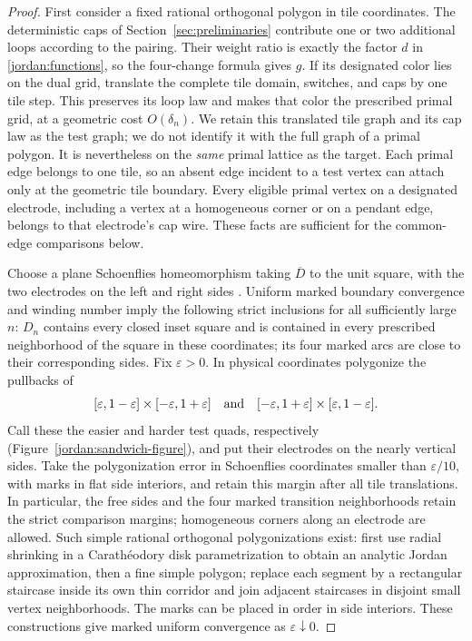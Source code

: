 \begin{proof}
First consider a fixed rational orthogonal polygon in tile coordinates.
The deterministic caps of Section~\ref{sec:preliminaries} contribute
one or two additional loops according to the pairing.  Their weight
ratio is exactly the factor $d$ in \eqref{jordan:functions}, so the
four-change formula gives $g$.  If its designated color lies on the
dual grid, translate the complete tile domain, switches, and caps by
one tile step.  This preserves its loop law and makes that color the
prescribed primal grid, at a geometric cost $O(\delta_n)$.  We retain
this translated tile graph and its cap law as the test graph; we do not
identify it with the full graph of a primal polygon.  It is nevertheless
on the \emph{same} primal lattice as the target.  Each primal edge belongs
to one tile, so an absent edge incident to a test vertex can attach only
at the geometric tile boundary.  Every eligible primal vertex on a
designated electrode, including a vertex at a homogeneous corner or
on a pendant edge, belongs to that electrode's cap wire.  These facts
are sufficient for the common-edge comparisons below.

Choose a plane Schoenflies homeomorphism taking $\overline D$ to the
unit square, with the two electrodes on the left and right sides
\citep[Theorem~3.1]{Thomassen1992JordanSchoenflies}.
Uniform marked boundary convergence and winding number imply the
following strict inclusions for all sufficiently large $n$: $D_n$
contains every closed inset square and is contained in every prescribed
neighborhood of the square in these coordinates; its four marked arcs
are close to their corresponding sides.  Fix $\varepsilon>0$.
In physical coordinates polygonize the pullbacks of
\[
 [\varepsilon,1-\varepsilon]\times[-\varepsilon,1+\varepsilon]
 \quad\hbox{and}\quad
 [-\varepsilon,1+\varepsilon]\times[\varepsilon,1-\varepsilon].
\]
Call these the easier and harder test quads, respectively
(Figure~\ref{jordan:sandwich-figure}), and put
their electrodes on the nearly vertical sides.  Take the polygonization
error in Schoenflies coordinates smaller than $\varepsilon/10$, with
marks in flat side interiors, and retain this margin after all tile
translations.  In particular, the free sides and the four marked
transition neighborhoods retain the strict comparison margins;
homogeneous corners along an electrode are allowed.  Such simple
rational orthogonal polygonizations exist:
first use radial shrinking in a Carath\'eodory disk parametrization to
obtain an analytic Jordan approximation, then a fine simple polygon;
replace each segment by a rectangular staircase inside its own thin
corridor and join adjacent staircases in disjoint small vertex
neighborhoods.  The marks can be placed in order in side interiors.
These constructions give marked uniform convergence as
$\varepsilon\downarrow0$.


\end{proof}
